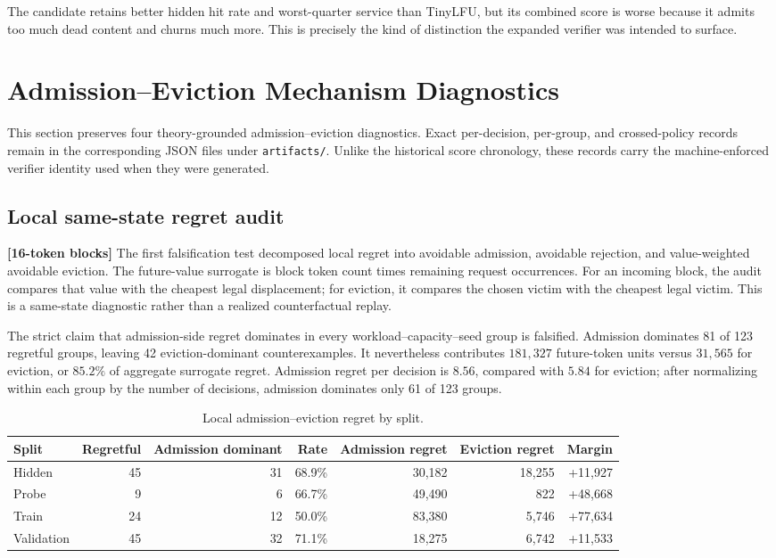 \documentclass[11pt]{article}
\newcommand{\filepath}[1]{\nolinkurl{#1}}
\newcommand{\blocktag}[1]{\textbf{\color{navy}[#1-token blocks]}}
\begin{document}
The candidate retains better hidden hit rate and worst-quarter service than TinyLFU,
but its combined score is worse because it admits too much dead content and churns much
more.  This is precisely the kind of distinction the expanded verifier was intended to
surface.

\section{Admission--Eviction Mechanism Diagnostics}
\label{sec:mechanism-diagnostics}

This section preserves four theory-grounded admission--eviction diagnostics.  Exact
per-decision, per-group, and crossed-policy records remain in the corresponding JSON
files under \filepath{artifacts/}.  Unlike the historical score chronology, these
records carry the machine-enforced verifier identity used when they were generated.

\subsection{Local same-state regret audit}

\blocktag{16} The first falsification test decomposed local regret into avoidable
admission, avoidable rejection, and value-weighted avoidable eviction.  The
future-value surrogate is block token count times remaining request occurrences.
For an incoming block, the audit compares that value with the cheapest legal
displacement; for eviction, it compares the chosen victim with the cheapest legal
victim.  This is a same-state diagnostic rather than a realized counterfactual replay.

The strict claim that admission-side regret dominates in every
workload--capacity--seed group is falsified.  Admission dominates 81 of 123 regretful
groups, leaving 42 eviction-dominant counterexamples.  It nevertheless contributes
\(181{,}327\) future-token units versus \(31{,}565\) for eviction, or \(85.2\%\) of
aggregate surrogate regret.  Admission regret per decision is \(8.56\), compared with
\(5.84\) for eviction; after normalizing within each group by the number of decisions,
admission dominates only 61 of 123 groups.

\begin{table}[H]
\centering
\small
\begin{tabular}{lrrrrrr}
\toprule
Split & Regretful & Admission dominant & Rate & Admission regret &
Eviction regret & Margin \\
\midrule
Hidden & 45 & 31 & 68.9\% & 30,182 & 18,255 & +11,927 \\
Probe & 9 & 6 & 66.7\% & 49,490 & 822 & +48,668 \\
Train & 24 & 12 & 50.0\% & 83,380 & 5,746 & +77,634 \\
Validation & 45 & 32 & 71.1\% & 18,275 & 6,742 & +11,533 \\
\bottomrule
\end{tabular}
\caption{Local admission--eviction regret by split.}
\label{tab:local-regret-by-split}
\end{table}
\end{document}
